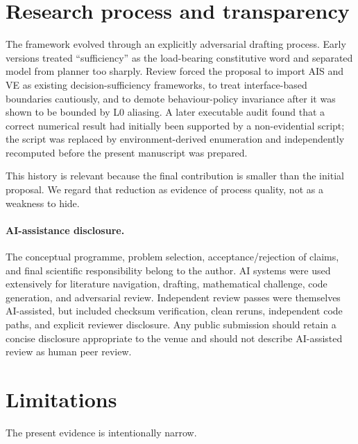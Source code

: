 \documentclass[10pt]{article}
\begin{document}
\section{Research process and transparency}

The framework evolved through an explicitly adversarial drafting process. Early versions treated ``sufficiency'' as the load-bearing constitutive word and separated model from planner too sharply. Review forced the proposal to import AIS and VE as existing decision-sufficiency frameworks, to treat interface-based boundaries cautiously, and to demote behaviour-policy invariance after it was shown to be bounded by L0 aliasing. A later executable audit found that a correct numerical result had initially been supported by a non-evidential script; the script was replaced by environment-derived enumeration and independently recomputed before the present manuscript was prepared.

This history is relevant because the final contribution is smaller than the initial proposal. We regard that reduction as evidence of process quality, not as a weakness to hide.

\paragraph{AI-assistance disclosure.}
The conceptual programme, problem selection, acceptance/rejection of claims, and final scientific responsibility belong to the author. AI systems were used extensively for literature navigation, drafting, mathematical challenge, code generation, and adversarial review. Independent review passes were themselves AI-assisted, but included checksum verification, clean reruns, independent code paths, and explicit reviewer disclosure. Any public submission should retain a concise disclosure appropriate to the venue and should not describe AI-assisted review as human peer review.

\section{Limitations}

The present evidence is intentionally narrow.
\end{document}
